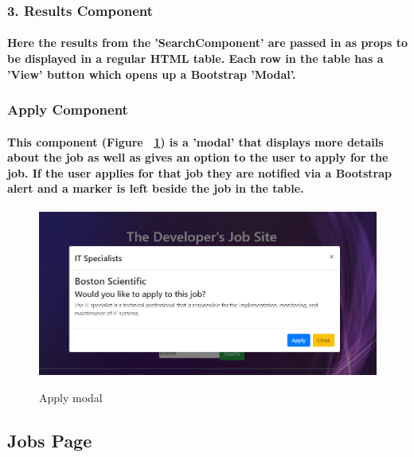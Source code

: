 \subsubsection{3. Results Component}
\paragraph{Here the results from the 'SearchComponent' are passed in as props to be displayed in a regular HTML table. Each row in the table has a 'View' button which opens up a Bootstrap 'Modal'.}
\subsubsection{Apply Component}
\paragraph{This component (Figure ~\ref{apply_label}) is a 'modal' that displays more details about the job as well as gives an option to the user to apply for the job. If the user applies for that job they are notified via a Bootstrap alert and a marker is left beside the job in the table.}
\begin{figure}[ht]
    \centering
    \includegraphics[scale=0.4]{Images/apply.png} 
    \label{apply_label}
    \caption{Apply modal}
\end{figure}
\subsection{Jobs Page}
